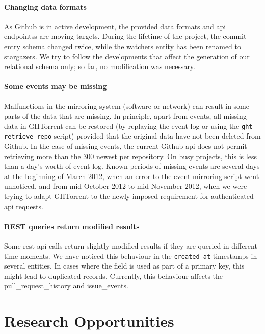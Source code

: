 \documentclass[conference]{IEEEtran}
\begin{document}
\paragraph*{Changing data formats} As Github is in active development, the
provided data formats and {\sc api} endpointss are moving targets. During the
lifetime of the project, the commit entry schema changed twice, while the
\textsf{watchers} entity has been renamed to \textsf{stargazers}. We try to
follow the developments that affect the generation of our relational schema
only; so far, no modification was necessary.

\paragraph*{Some events may be missing} Malfunctions in the mirroring system
    (software or network) can result in some parts of the data that are missing.
    In principle, apart from events, all missing data in GHTorrent can be
    restored (by replaying the event log or using the \texttt{ght-retrieve-repo}
    script) provided that the original data have not been deleted from Github.
    In the case of missing events, the current Github {\sc api} does not permit
    retrieving more than the 300 newest per repository. On busy projects, this
    is less than a day's worth of event log. Known periods of missing events are
    several days at the beginning of March 2012, when an error to the event
    mirroring script went unnoticed, and from mid October 2012 to mid November
    2012, when we were trying to adapt GHTorrent to the newly imposed
    requirement for authenticated {\sc api} requests.

\paragraph*{REST queries return modified results} Some {\sc rest api} calls
return slightly modified results if they are queried in different time 
moments. We have noticed this behaviour in the \texttt{created\_at} 
timestamps in several entities. In cases where the field is used as part
of a primary key, this might lead to duplicated records. Currently, this 
behaviour affects the \textsf{pull\_request\_history} and
\textsf{issue\_events}.

\section{Research Opportunities}
\end{document}
